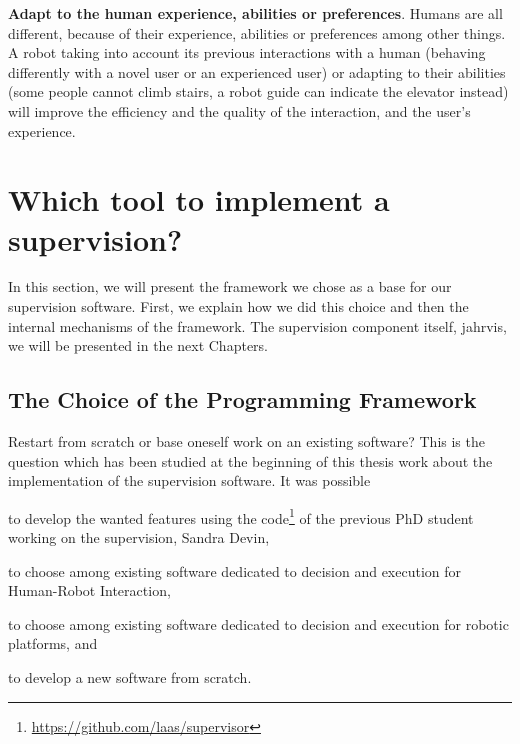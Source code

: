 \documentclass[a4paper,11pt,twoside]{StyleThese}
\begin{document}
\begin{bulletList}
	\item \textbf{Adapt to the human experience, abilities or preferences}. Humans are all different, because of their experience, abilities or preferences among other things. A robot taking into account its previous interactions with a human (\eg behaving differently with a novel user or an experienced user) or adapting to their abilities (\eg some people cannot climb stairs, a robot guide can indicate the elevator instead) will improve the efficiency and the quality of the interaction, and the user's experience.
\end{bulletList}


\section{Which tool to implement a supervision?}\label{chap4:sec:bdi}

In this section, we will present the framework we chose as a base for our supervision software. First, we explain how we did this choice and then the internal mechanisms of the framework. The supervision component itself, \acrshort{jahrvis}, we will be presented in the next Chapters.

\subsection{The Choice of the Programming Framework}


Restart from scratch or base oneself work on an existing software? This is the question which has been studied at the beginning of this thesis work about the implementation of the supervision software. It was possible 
\begin{inlineEnumerate}
	\item to develop the wanted features using the code\footnote{\url{https://github.com/laas/supervisor}} of the previous PhD student working on the supervision, Sandra Devin,\label{chap4:list:sandra}
	\item to choose among existing software dedicated to decision and execution for Human-Robot Interaction,\label{chap4:list:soft_hri}
	\item to choose among existing software dedicated to decision and execution for robotic platforms, and\label{chap4:list:robot}
	\item to develop a new software from scratch.\label{chap4:list:new}
\end{inlineEnumerate}
\end{document}
